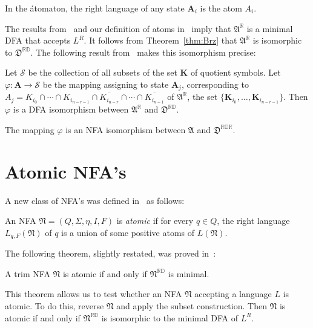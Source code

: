 \documentclass{llncs}
\newcommand{\ol}{\overline}
\newcommand{\bK}{{\mathbf K}}
\newcommand{\bmA}{\bm{A}}
\newcommand{\bmK}{\bm{K}}
\newcommand{\cS}{{\mathcal S}}
\newcommand{\fA}{{\mathfrak A}}
\newcommand{\fD}{{\mathfrak D}}
\newcommand{\fN}{{\mathfrak N}}
\newcommand{\rev}{\mathbb{R}}
\newcommand{\deter}{\mathbb{D}}
\begin{document}
In the \'atomaton, the right language of any state ${\mathbf A_i}$ is the atom $A_i$.
\smallskip

The results from~\cite{BrTa11} and  our definition of 
atoms in~\cite{BrTa12} imply that $\fA^\rev$ is a minimal DFA 
that accepts $L^R$. It follows from Theorem~\ref{thm:Brz} that  
$\fA^\rev$ is isomorphic to $\fD^{\rev\deter}$.
The following result from~\cite{BrTa12} makes this isomorphism precise:

\begin{theorem}[Isomorphism]
\label{thm:isomorphism}
Let $\cS$ be the collection of all subsets of the set $\bmK$ of quotient symbols.
Let $\varphi: \bmA \to \cS$ be the mapping assigning to state 
${\mathbf A}_j$, corresponding to
$A_j=K_{i_0}\cap\cdots\cap K_{i_{n-r-1}}\cap\ol{K_{i_{n-r}}}
\cap\cdots\cap \ol{K_{i_{n-1}}}$ of $\fA^\rev$, the set 
$\{\bK_{i_0},\ldots, \bK_{i_{n-r-1}}\}$.
Then $\varphi$ is a DFA isomorphism between $\fA^\rev$ and 
$\fD^{\rev\deter}$. 
\end{theorem}

\begin{corollary}
\label{cor:isomorphism}
The mapping $\varphi$ is an NFA isomorphism between 
$\fA$ and $\fD^{\rev\deter\rev}$.
\end{corollary}



\section{Atomic NFA's}
\label{sec:atomic}


A new class of NFA's was defined in~\cite{BrTa11} as follows:   

\begin{definition}
\label{def:atomic}
An NFA $\fN=(Q,\Sigma,\eta,I,F)$ is \emph{atomic} if for every  
$q\in Q$, the right language $L_{q,F}(\fN)$ of $q$ is a union of some positive  atoms of $L(\fN)$. 
\end{definition}

The following theorem, slightly restated, was proved in~\cite{BrTa11}:
\newpage

\begin{theorem}[Atomicity]
\label{thm:atomic}
A trim NFA $\fN$ is atomic if and only if $\fN^{\rev\deter}$
is minimal.
\end{theorem}

This theorem allows us to test whether an NFA $\fN$ accepting a language $L$ is atomic. To do this, reverse $\fN$ and apply the subset construction. Then $\fN$ is atomic if and only if $\fN^{\rev\deter}$
is isomorphic to the minimal DFA of $L^R$.
\end{document}
